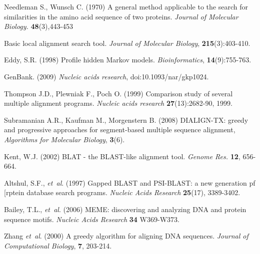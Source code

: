 \documentclass[phd,tocprelim]{cornell}
\begin{document}
\begin{thebibliography}{}

Needleman S., Wunsch C. (1970) A general method applicable to the search for similarities in the amino acid sequence of two proteins.
\textit{Journal of Molecular Biology.} \textbf{48}(3),443-453

Basic local alignment search tool. \textit{Journal of Molecular Biology}, \textbf{215}(3):403-410.

Eddy, S.R. (1998) Profile hidden Markov models. \textit{Bioinformatics}, \textbf{14}(9):755-763.

GenBank. (2009) \textit{Nucleic acids research}, doi:10.1093/nar/gkp1024.

Thompson J.D., Plewniak F., Poch O. (1999) Comparison study of several multiple alignment programs.
\textit{Nucleic acids research} \textbf{27}(13):2682-90, 1999.

Subramanian A.R., Kaufman M., Morgenstern B. (2008) DIALIGN-TX: greedy and progressive approaches for segment-based multiple sequence alignment, {\it Algorithms for Molecular Biology}, {\bf 3}(6).

Kent, W.J. (2002) BLAT - the BLAST-like alignment tool. \textit{Genome Res.} \textbf{12}, 656-664.

Altshul, S.F., \textit{et~al}. (1997) Gapped BLAST and PSI-BLAST: a new generation pf [rptein database search programs. \textit{Nucleic Acids Research} \textbf{25}(17), 3389-3402.

Bailey, T.L., \textit{et~al}. (2006) MEME: discovering and analyzing DNA and protein sequence motifs. \textit{Nucleic Acids Research} \textbf{34} W369-W373.

Zhang \textit{et~al}. (2000) A greedy algorithm for aligning DNA sequences. \textit{Journal of Computational Biology}, \textbf{7}, 203-214.


\end{thebibliography}
\end{document}
